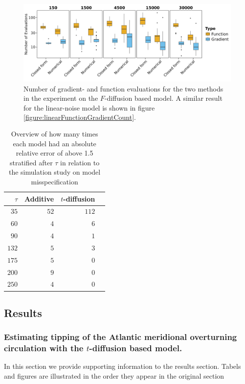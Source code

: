 \begin{figure}[h!]
    \begin{center}
    \includegraphics[scale = .08]{figures/function_gradient_count_F_plot.jpeg}     
    \caption{Number of gradient- and function evaluations for the two methods in the experiment on the $F$-diffusion based model. A similar result for the linear-noise model is shown in figure \ref{figure:linearFunctionGradientCount}.}
    \label{figure:FFunctionGradientCount}   
    \end{center}
\end{figure}
\begin{table}[h!]
    \centering
    \begin{tabular}{rrrr}
    $\tau$ & Additive & $t$-diffusion \\ 
      \hline
      $35$ &  $52$ & $112$ \\ 
      $60$ &   $4$ & $6$ \\ 
      $90$ &   $4$ & $1$ \\ 
      $132$ &  $5$ & $3$ \\ 
      $175$ &  $5$ & $0$ \\ 
      $200$ &  $9$ & $0$ \\ 
      $250$ &  $4$ & $0$ \\ 
       \hline
    \end{tabular}
    \caption{Overview of how many times each model had an absolute relative error of above 1.5 stratified after $\tau$ in relation to the simulation study on model misspecification}
    \label{table:AREabove1.5tauSim}
    \end{table}
\newpage
    \subsection{Results}
    \subsubsection{Estimating tipping of the Atlantic meridional overturning circulation with the \texorpdfstring{$t$}{t}-diffusion based model.}
    In this section we provide supporting information to the results section. Tabels and figures are illustrated in the order they appear in the original section


